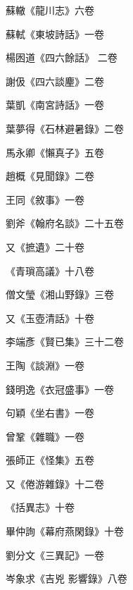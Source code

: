 \begin{pinyinscope}
 蘇轍《龍川志》六卷



 蘇軾《東坡詩話》一卷



 楊囦道《四六餘話》
 二卷



 謝伋《四六談麈》二卷



 葉凱《南宮詩話》一卷



 葉夢得《石林避暑錄》二卷



 馬永卿《懶真子》五卷



 趙概《見聞錄》二卷



 王同《敘事》一卷



 劉斧《翰府名談》二十五卷



 又《摭遺》二十卷



 《青瑣高議》十八卷



 僧文瑩《湘山野錄》三卷



 又《玉壺清話》十卷



 李端彥《賢已集》三十二卷



 王陶《談淵》一卷



 錢明逸《衣冠盛事》一卷



 句穎《坐右書》一卷



 曾鞏《雜職》一卷



 張師正《怪集》五卷



 又《倦游雜錄》十二卷



 《括異志》十卷



 畢仲詢《幕府燕閑錄》十卷



 劉分文《三異記》一卷



 岑象求《吉兇
 影響錄》八卷




\end{pinyinscope}
